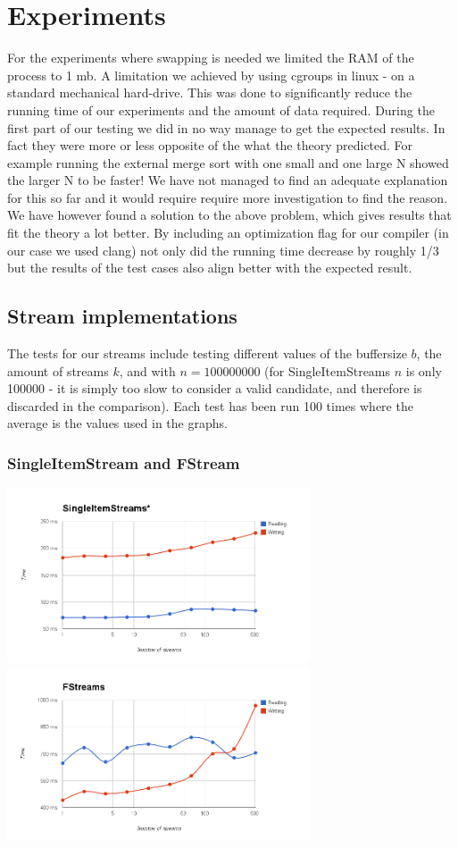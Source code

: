 \section{Experiments}

For the experiments where swapping is needed we limited the RAM of the process to 1 mb. A limitation we achieved by using cgroups in linux - on a standard mechanical hard-drive. This was done to significantly reduce the running time of our experiments and the amount of data required. 
During the first part of our testing we did in no way manage to get the expected results. In fact they were more or less opposite of the what the theory predicted. For example running the external merge sort with one small and one large N showed the larger N to be faster! We have not managed to find an adequate explanation for this so far and it would require require more investigation to find the reason.
We have however found a solution to the above problem, which gives results that fit the theory a lot better. By including an optimization flag for our compiler (in our case we used clang) not only did the running time decrease by roughly 1/3 but the results of the test cases also align better with the expected result. 

\subsection{Stream implementations}
The tests for our streams include testing different values of the buffersize $b$, the amount of streams $k$, and with $n = 100000000$ (for SingleItemStreams $n$ is only 100000 - it is simply too slow to consider a valid candidate, and therefore is discarded in the comparison). 
Each test has been run 100 times where the average is the values used in the graphs. 

\subsubsection{SingleItemStream and FStream}
\includegraphics[width=90mm]{graphics/SIS.png}
\includegraphics[width=90mm]{graphics/FS.png}

